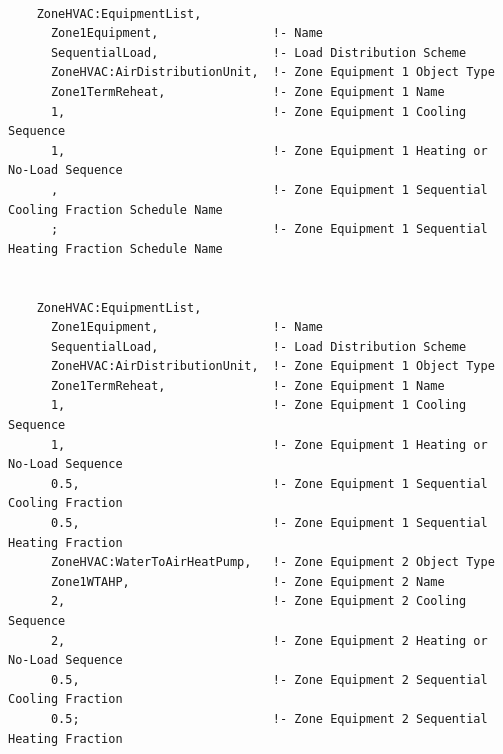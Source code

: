 \begin{lstlisting}

    ZoneHVAC:EquipmentList,
      Zone1Equipment,                !- Name
      SequentialLoad,                !- Load Distribution Scheme
      ZoneHVAC:AirDistributionUnit,  !- Zone Equipment 1 Object Type
      Zone1TermReheat,               !- Zone Equipment 1 Name
      1,                             !- Zone Equipment 1 Cooling Sequence
      1,                             !- Zone Equipment 1 Heating or No-Load Sequence
      ,                              !- Zone Equipment 1 Sequential Cooling Fraction Schedule Name
      ;                              !- Zone Equipment 1 Sequential Heating Fraction Schedule Name


    ZoneHVAC:EquipmentList,
      Zone1Equipment,                !- Name
      SequentialLoad,                !- Load Distribution Scheme
      ZoneHVAC:AirDistributionUnit,  !- Zone Equipment 1 Object Type
      Zone1TermReheat,               !- Zone Equipment 1 Name
      1,                             !- Zone Equipment 1 Cooling Sequence
      1,                             !- Zone Equipment 1 Heating or No-Load Sequence
      0.5,                           !- Zone Equipment 1 Sequential Cooling Fraction
      0.5,                           !- Zone Equipment 1 Sequential Heating Fraction
      ZoneHVAC:WaterToAirHeatPump,   !- Zone Equipment 2 Object Type
      Zone1WTAHP,                    !- Zone Equipment 2 Name
      2,                             !- Zone Equipment 2 Cooling Sequence
      2,                             !- Zone Equipment 2 Heating or No-Load Sequence
      0.5,                           !- Zone Equipment 2 Sequential Cooling Fraction
      0.5;                           !- Zone Equipment 2 Sequential Heating Fraction
\end{lstlisting}
